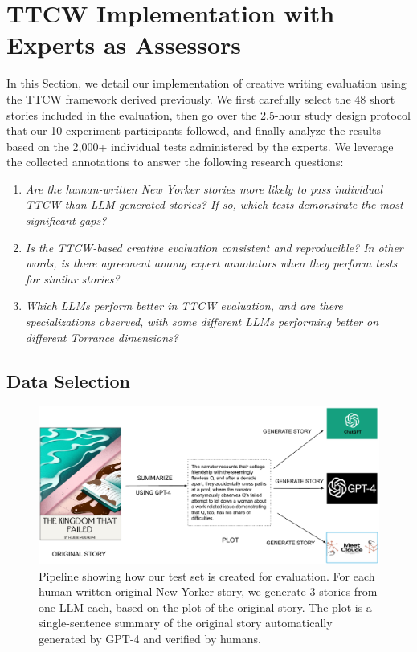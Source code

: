 \section{TTCW Implementation with Experts as Assessors} \label{sec:data}
In this Section, we detail our implementation of creative writing evaluation using the TTCW framework derived previously. We first carefully select the 48 short stories included in the evaluation, then go over the 2.5-hour study design protocol that our 10 experiment participants followed, and finally analyze the results based on the 2,000+ individual tests administered by the experts. We leverage the collected annotations to answer the following research questions:
\begin{enumerate}[label=RQ\arabic*:,leftmargin=2.5em]
    \item \textit{Are the human-written New Yorker stories more likely to pass individual TTCW than LLM-generated stories? If so, which tests demonstrate the most significant gaps?}
    \item \textit{Is the TTCW-based creative evaluation consistent and reproducible? In other words, is there agreement among expert annotators when they perform tests for similar stories?}
    \item \textit{Which LLMs perform better in TTCW evaluation, and are there specializations observed, with some different LLMs performing better on different Torrance dimensions?}
\end{enumerate}

\subsection{Data Selection}

\begin{figure}
\centering
\includegraphics[width=\textwidth]{figures/datapipeline.pdf}
\caption{\label{datapipeline}Pipeline showing how our test set is created for evaluation. For each human-written original New Yorker story, we generate 3 stories from one LLM each, based on the plot of the original story. The plot is a single-sentence summary of the original story automatically generated by GPT-4 and verified by humans.}
\end{figure}

